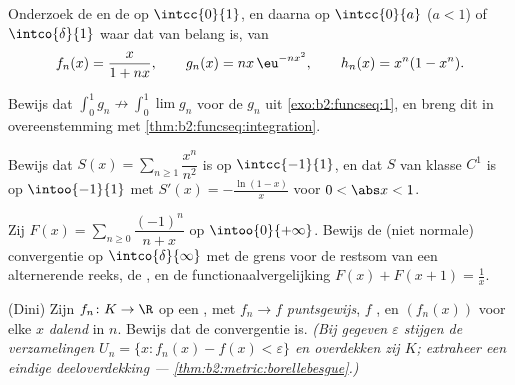 \begin{exercise}[$\star$]\label{exo:b2:funcseq:1}
Onderzoek de  en de  op
$\intcc{0}{1}$, en daarna op $\intcc{0}{a}$ ($a < 1$) of
$\intco{\delta}{1}$ waar dat van belang is, van
\[
f_n(x) = \frac{x}{1 + nx},
\qquad
g_n(x) = n x\,\eu^{-n x^2},
\qquad
h_n(x) = x^n(1 - x^n).
\]
\end{exercise}

\begin{exercise}[$\star$]\label{exo:b2:funcseq:2}
Bewijs dat $\displaystyle\int_0^1 g_n \not\to \int_0^1 \lim g_n$
voor de $g_n$ uit \cref{exo:b2:funcseq:1}, en breng dit in
overeenstemming met \cref{thm:b2:funcseq:integration}.
\end{exercise}

\begin{exercise}[$\star$]\label{exo:b2:funcseq:3}
Bewijs dat $S(x) = \sum_{n\geq1} \dfrac{x^n}{n^2}$  is op
$\intcc{-1}{1}$, en dat $S$ van klasse $C^1$ is op
$\intoo{-1}{1}$ met $S'(x) = -\frac{\ln(1-x)}{x}$ voor $0 < \abs x
< 1$.
\end{exercise}

\begin{exercise}[$\star\star$]\label{exo:b2:funcseq:4}
Zij $F(x) = \sum_{n \geq 0} \dfrac{(-1)^n}{n + x}$ op
$\intoo{0}{+\infty}$. Bewijs de  (niet normale)
convergentie op $\intco{\delta}{\infty}$ met de grens voor de
restsom van een alternerende reeks, de , en de
functionaalvergelijking $F(x) + F(x + 1) = \frac1x$.
\end{exercise}

\begin{exercise}[$\star\star$]\label{exo:b2:funcseq:5}
(Dini) Zijn $f_n \colon K \to \R$  op een \emph{}
, met $f_n \to f$ \emph{puntsgewijs}, $f$ ,
en $(f_n(x))$ voor elke $x$ \emph{dalend} in $n$. Bewijs dat de
convergentie  is. \emph{(Bij gegeven $\varepsilon$ stijgen
de  verzamelingen $U_n = \{x : f_n(x) - f(x) < \varepsilon\}$
en overdekken zij $K$; extraheer een eindige deeloverdekking ---
\cref{thm:b2:metric:borellebesgue}.)}
\end{exercise}

